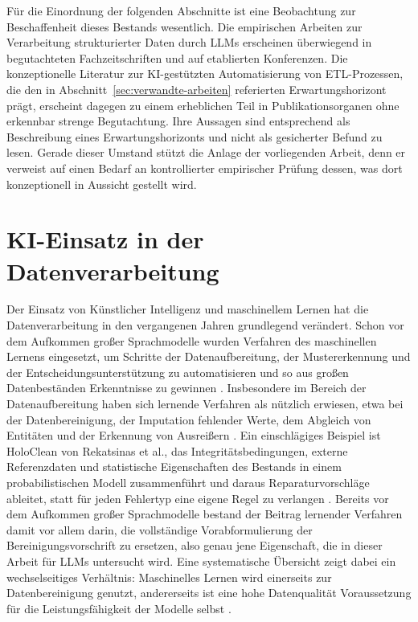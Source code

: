 Für die Einordnung der folgenden Abschnitte ist eine Beobachtung zur Beschaffenheit dieses Bestands wesentlich. Die empirischen Arbeiten zur Verarbeitung strukturierter Daten durch \acp{LLM} erscheinen überwiegend in begutachteten Fachzeitschriften und auf etablierten Konferenzen. Die konzeptionelle Literatur zur \ac{KI}-gestützten Automatisierung von \ac{ETL}-Prozessen, die den in Abschnitt~\ref{sec:verwandte-arbeiten} referierten Erwartungshorizont prägt, erscheint dagegen zu einem erheblichen Teil in Publikationsorganen ohne erkennbar strenge Begutachtung. Ihre Aussagen sind entsprechend als Beschreibung eines Erwartungshorizonts und nicht als gesicherter Befund zu lesen. Gerade dieser Umstand stützt die Anlage der vorliegenden Arbeit, denn er verweist auf einen Bedarf an kontrollierter empirischer Prüfung dessen, was dort konzeptionell in Aussicht gestellt wird.

\section{KI-Einsatz in der Datenverarbeitung}
\label{sec:ki-datenverarbeitung}

Der Einsatz von Künstlicher Intelligenz und maschinellem Lernen hat die Datenverarbeitung in den vergangenen Jahren grundlegend verändert. Schon vor dem Aufkommen großer Sprachmodelle wurden Verfahren des maschinellen Lernens eingesetzt, um Schritte der Datenaufbereitung, der Mustererkennung und der Entscheidungsunterstützung zu automatisieren und so aus großen Datenbeständen Erkenntnisse zu gewinnen \autocite{bharadiyaRoleMachineLearning2023,safitraAdvancementsArtificialIntelligence2024}. Insbesondere im Bereich der Datenaufbereitung haben sich lernende Verfahren als nützlich erwiesen, etwa bei der Datenbereinigung, der Imputation fehlender Werte, dem Abgleich von Entitäten und der Erkennung von Ausreißern \autocite{coteDataCleaningMachine2024,mumuniAutomatedDataProcessing2025}. Ein einschlägiges Beispiel ist HoloClean von Rekatsinas et al., das Integritätsbedingungen, externe Referenzdaten und statistische Eigenschaften des Bestands in einem probabilistischen Modell zusammenführt und daraus Reparaturvorschläge ableitet, statt für jeden Fehlertyp eine eigene Regel zu verlangen \autocite{rekatsinasHoloClean2017}. Bereits vor dem Aufkommen großer Sprachmodelle bestand der Beitrag lernender Verfahren damit vor allem darin, die vollständige Vorabformulierung der Bereinigungsvorschrift zu ersetzen, also genau jene Eigenschaft, die in dieser Arbeit für \acp{LLM} untersucht wird. Eine systematische Übersicht zeigt dabei ein wechselseitiges Verhältnis: Maschinelles Lernen wird einerseits zur Datenbereinigung genutzt, andererseits ist eine hohe Datenqualität Voraussetzung für die Leistungsfähigkeit der Modelle selbst \autocite{coteDataCleaningMachine2024,mumuniAutomatedDataProcessing2025}.

